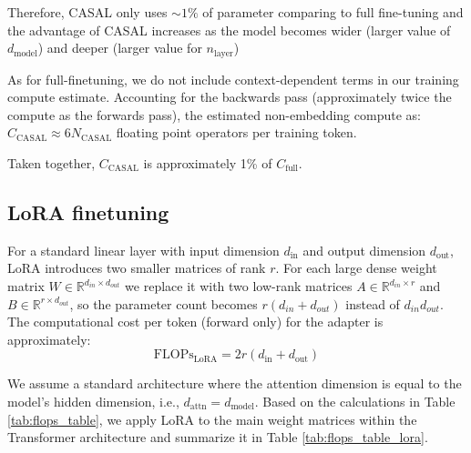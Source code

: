 \documentclass{article} %
\begin{document}
Therefore, CASAL only uses $\sim 1\%$ of parameter comparing to full fine-tuning and the advantage of CASAL  increases as the model becomes wider (larger value of $d_{\text{model}}$) and deeper (larger value for $n_{\text{layer}}$)

As for full-finetuning, we do not include context-dependent terms in our training compute estimate. Accounting for the backwards pass (approximately twice the compute as the forwards pass), the estimated non-embedding compute as: $C_{\text{CASAL}} \approx 6N_{\text{CASAL}}$ floating point operators per training token. 

Taken together,  $C_{\text{CASAL}}$ is approximately  1\% of  $C_{\text{full}}$. 

\subsection{LoRA finetuning}
\label{app:lora}


For a standard linear layer with input dimension $d_{\text{in}}$ and output dimension $d_{\text{out}}$, LoRA introduces two smaller matrices of rank $r$. For each large dense weight matrix 
$W \in \mathbb{R}^{d_{in} \times d_{out}}$ 
we replace it with two low-rank matrices 
$A \in \mathbb{R}^{d_{in} \times r}$ 
and 
$B \in \mathbb{R}^{r \times d_{out}}$, 
so the parameter count becomes $r(d_{in}+d_{out})$ instead of $d_{in}d_{out}$. The computational cost per token (forward only)  for the adapter is approximately:
$$ \text{FLOPs}_{\text{LoRA}} = 2r(d_{\text{in}} + d_{\text{out}}) $$


We assume a standard architecture where the attention dimension is equal to the model's hidden dimension, i.e., $d_{\text{attn}} = d_{\text{model}}$. Based on the calculations in Table \ref{tab:flops_table}, we apply LoRA to the main weight matrices within the Transformer architecture and summarize it in Table \ref{tab:flops_table_lora}.
\end{document}
